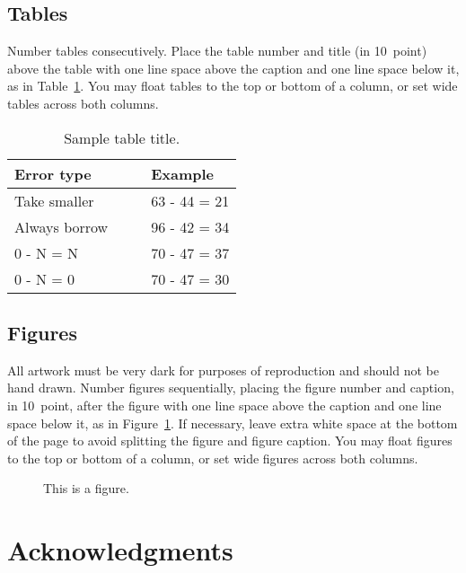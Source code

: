 \documentclass[10pt,letterpaper]{article}
\begin{document}
\subsection{Tables}

Number tables consecutively. Place the table number and title (in
10~point) above the table with one line space above the caption and
one line space below it, as in Table~\ref{sample-table}. You may float
tables to the top or bottom of a column, or set wide tables across
both columns.

\begin{table}[!ht]
\begin{center}
\caption{Sample table title.}
\label{sample-table}
\vskip 0.12in
\begin{tabular}{ll}
\hline
Error type & Example \\
\hline
Take smaller & 63 - 44 = 21 \\
Always borrow~~~~ & 96 - 42 = 34 \\
0 - N = N & 70 - 47 = 37 \\
0 - N = 0 & 70 - 47 = 30 \\
\hline
\end{tabular}
\end{center}
\end{table}


\subsection{Figures}

All artwork must be very dark for purposes of reproduction and should
not be hand drawn. Number figures sequentially, placing the figure
number and caption, in 10~point, after the figure with one line space
above the caption and one line space below it, as in
Figure~\ref{sample-figure}. If necessary, leave extra white space at
the bottom of the page to avoid splitting the figure and figure
caption. You may float figures to the top or bottom of a column, or
set wide figures across both columns.

\begin{figure}[ht]
\begin{center}
\end{center}
\caption{This is a figure.}
\label{sample-figure}
\end{figure}


\section{Acknowledgments}
\end{document}
